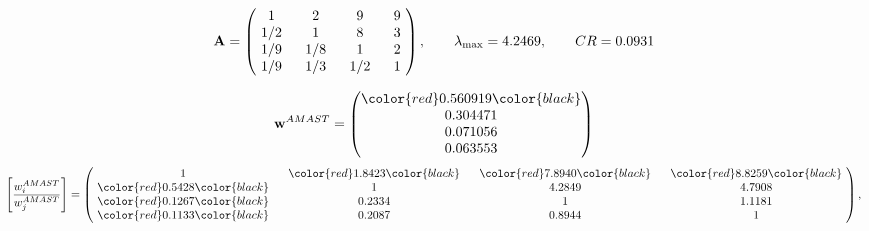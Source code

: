 \begin{example}
\begin{equation*}
\mathbf{A} =
\begin{pmatrix}
$\,\,$ 1 $\,\,$ & $\,\,$2$\,\,$ & $\,\,$9$\,\,$ & $\,\,$9 $\,\,$ \\
$\,\,$ 1/2$\,\,$ & $\,\,$ 1 $\,\,$ & $\,\,$8$\,\,$ & $\,\,$3 $\,\,$ \\
$\,\,$ 1/9$\,\,$ & $\,\,$ 1/8$\,\,$ & $\,\,$ 1 $\,\,$ & $\,\,$2 $\,\,$ \\
$\,\,$ 1/9$\,\,$ & $\,\,$ 1/3$\,\,$ & $\,\,$ 1/2$\,\,$ & $\,\,$ 1  $\,\,$ \\
\end{pmatrix},
\qquad
\lambda_{\max} =
4.2469,
\qquad
CR = 0.0931
\end{equation*}

\begin{equation*}
\mathbf{w}^{AMAST} =
\begin{pmatrix}
\color{red} 0.560919\color{black} \\
0.304471\\
0.071056\\
0.063553
\end{pmatrix}\end{equation*}
\begin{equation*}
\left[ \frac{{w}^{AMAST}_i}{{w}^{AMAST}_j} \right] =
\begin{pmatrix}
$\,\,$ 1 $\,\,$ & $\,\,$\color{red} 1.8423\color{black} $\,\,$ & $\,\,$\color{red} 7.8940\color{black} $\,\,$ & $\,\,$\color{red} 8.8259\color{black} $\,\,$ \\
$\,\,$\color{red} 0.5428\color{black} $\,\,$ & $\,\,$ 1 $\,\,$ & $\,\,$4.2849$\,\,$ & $\,\,$4.7908  $\,\,$ \\
$\,\,$\color{red} 0.1267\color{black} $\,\,$ & $\,\,$0.2334$\,\,$ & $\,\,$ 1 $\,\,$ & $\,\,$1.1181 $\,\,$ \\
$\,\,$\color{red} 0.1133\color{black} $\,\,$ & $\,\,$0.2087$\,\,$ & $\,\,$0.8944$\,\,$ & $\,\,$ 1  $\,\,$ \\
\end{pmatrix},
\end{equation*}


\end{example}
